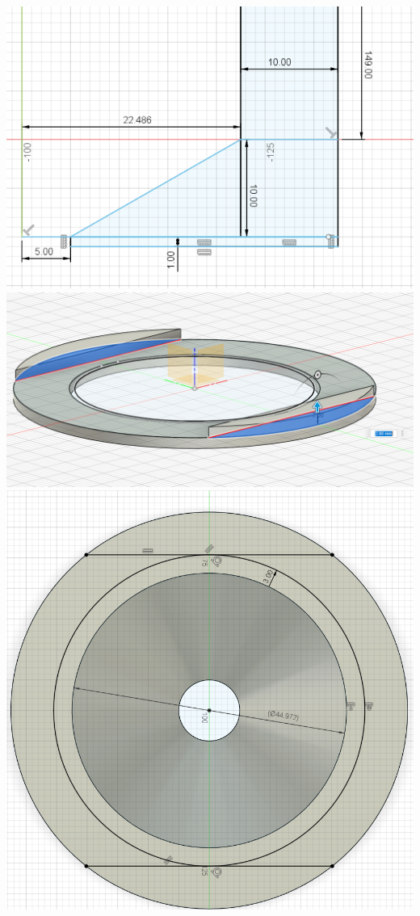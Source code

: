 \includegraphics[width=\textwidth]{3dprints/syringe_holder_side.png}
\includegraphics[width=\textwidth]{3dprints/syringe_holder_top.png}
\includegraphics[width=\textwidth]{3dprints/syringe_holder_top_2.png}